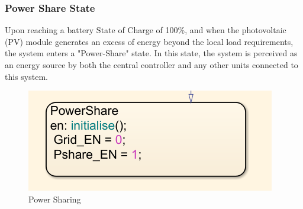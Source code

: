 \subsubsection{Power Share State}
Upon reaching a battery State of Charge of 100\%, and when the photovoltaic (PV) module generates an excess of energy beyond the local load requirements, the system enters a "Power-Share" state. In this state, the system is perceived as an energy source by both the central controller and any other units connected to this system.\par
\begin{figure}[H]
	\centering
	\includegraphics[totalheight=4cm]{Figures/power share state.png}
	\caption{Power Sharing}
\end{figure}
